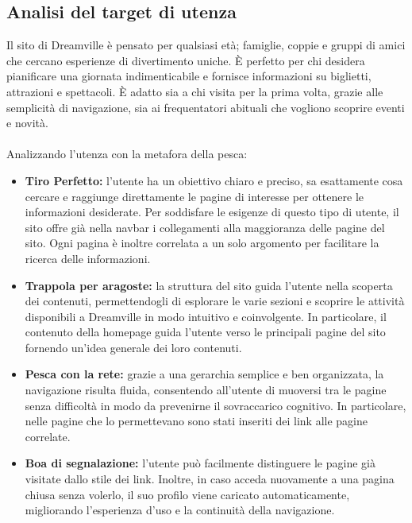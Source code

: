 \subsection{Analisi del target di utenza}
Il sito di Dreamville è pensato per qualsiasi età; famiglie, coppie e gruppi di amici che cercano esperienze di divertimento uniche. È perfetto per chi desidera pianificare una giornata indimenticabile e fornisce informazioni su biglietti, attrazioni e spettacoli. È adatto sia a chi visita per la prima volta, grazie alle semplicità di navigazione, sia ai frequentatori abituali che vogliono scoprire eventi e novità.
\\ \\
Analizzando l'utenza con la metafora della pesca:
\begin{itemize}
    \item \textbf{Tiro Perfetto:} l'utente ha un obiettivo chiaro e preciso, sa esattamente cosa cercare e raggiunge direttamente le pagine di interesse per ottenere le informazioni desiderate. Per soddisfare le esigenze di questo tipo di utente, il sito offre già nella navbar i collegamenti alla maggioranza delle pagine del sito. Ogni pagina è inoltre correlata a un solo argomento per facilitare la ricerca delle informazioni.
    
    \item \textbf{Trappola per aragoste:} la struttura del sito guida l'utente nella scoperta dei contenuti, permettendogli di esplorare le varie sezioni e scoprire le attività disponibili a Dreamville in modo intuitivo e coinvolgente. In particolare, il contenuto della homepage guida l'utente verso le principali pagine del sito fornendo un'idea generale dei loro contenuti.
    
    \item \textbf{Pesca con la rete:} grazie a una gerarchia semplice e ben organizzata, la navigazione risulta fluida, consentendo all'utente di muoversi tra le pagine senza difficoltà in modo da prevenirne il sovraccarico cognitivo. In particolare, nelle pagine che lo permettevano sono stati inseriti dei link alle pagine correlate.
    
    \item \textbf{Boa di segnalazione:} l'utente può facilmente distinguere le pagine già visitate dallo stile dei link. Inoltre, in caso acceda nuovamente a una pagina chiusa senza volerlo, il suo profilo viene caricato automaticamente, migliorando l’esperienza d’uso e la continuità della navigazione.
\end{itemize}